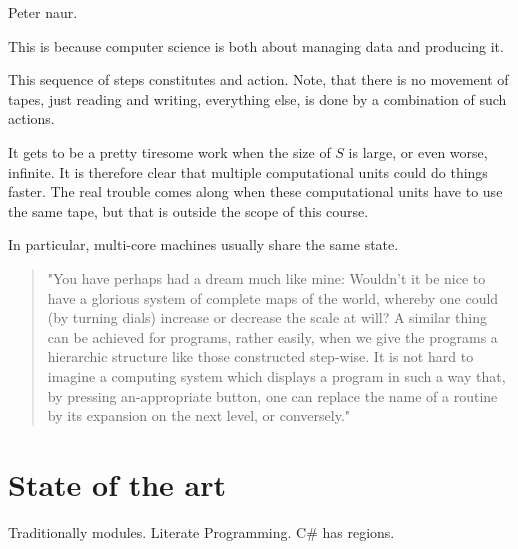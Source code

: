 Peter naur.

This is because computer science is both about
managing data and producing it. 

This sequence of steps constitutes and action. Note, that there is no movement
of tapes, just reading and writing, everything else, is done by a combination
of such actions.


It gets to be a pretty tiresome work when the size of
$S$ is large, or even worse, infinite. It is therefore clear that multiple computational
units could do things faster. The real trouble comes along when these
computational units have to use the same tape, but that is outside the scope of
this course.

In particular, multi-core machines usually share the same state.




\begin{quote}"You have perhaps had a dream much like mine: Wouldn't it be nice
to have a glorious system of complete maps of the world, whereby one could (by
turning dials) increase or decrease the scale at will? A similar thing can be
achieved for programs, rather easily, when we give the programs a hierarchic
structure like those constructed step-wise. It is not hard to imagine a
computing system which displays a program in such a way that, by pressing
an-appropriate button, one can replace the name of a routine by its expansion
on the next level, or conversely."\cite{knuth-review-of-sp}\end{quote}




\section{State of the art}

Traditionally modules. Literate Programming. C\# has regions.


